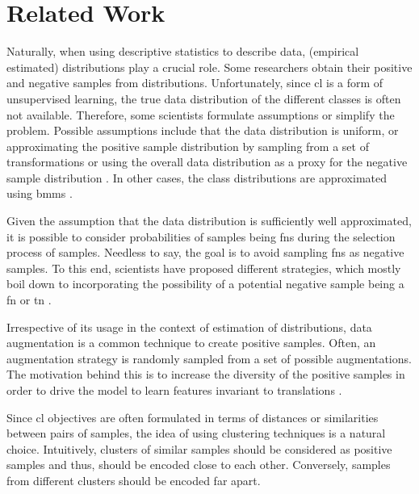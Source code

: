 \section{Related Work}\label{sec:related_work}

Naturally, when using descriptive statistics to describe data, (empirical estimated) distributions play a crucial role.
Some researchers obtain their positive and negative samples from distributions.
Unfortunately, since \ac{cl} is a form of unsupervised learning, 
the true data distribution of the different classes is often not available.
Therefore, some scientists formulate assumptions or simplify the problem.
Possible assumptions include that the data distribution is uniform,
or approximating the positive sample distribution by sampling from a set of transformations 
or using the overall data distribution as a proxy for the negative sample distribution \citet{chuang_debiased_2020,robinson_contrastive_2021}.
In other cases, the class distributions are approximated using \acp{bmm} \citet{progcl_2022}.

Given the assumption that the data distribution is sufficiently well approximated, 
it is possible to consider probabilities of samples being \acp{fn} during the selection process of samples.
Needless to say, the goal is to avoid sampling \acp{fn} as negative samples.
To this end, scientists have proposed different strategies, which mostly boil down to 
incorporating the possibility of a potential negative sample being a \ac{fn} or \ac{tn} 
\citet{chuang_debiased_2020,robinson_contrastive_2021,progcl_2022}.


Irrespective of its usage in the context of estimation of distributions, 
data augmentation is a common technique to create positive samples.
Often, an augmentation strategy is randomly sampled from a set of possible augmentations.
The motivation behind this is to increase the diversity of the positive samples 
in order to drive the model to learn features invariant to translations 
\citet{PIC_2020,swav_2020,local_aggr_2019,grape_2024,CL_temp_2021}.


Since \ac{cl} objectives are often formulated in terms of distances or similarities between pairs of samples, 
the idea of using clustering techniques is a natural choice.
Intuitively, clusters of similar samples should be considered as positive samples and thus,
should be encoded close to each other.
Conversely, samples from different clusters should be encoded far apart.

